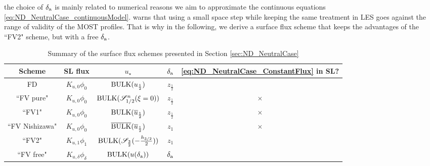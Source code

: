 the choice of $\delta_{\rm a}$ is mainly related to numerical
reasons we aim to approximate the continuous equations
\eqref{eq:ND_NeutralCase_continuousModel}.
\cite{basu_cautionary_2017} warns that using a small space step
while keeping the same treatment in LES goes against the
range of validity of the MOST profiles.
That is why in the following,
we derive a surface flux scheme that keeps
the advantages of the ``FV2" scheme, but with a free $\delta_{\rm a}$.
%
\begin{table}
	\centering
\begin{tabular}{c|c|c|c|c}
	Scheme & SL flux & $u_\star$ & $\delta_{\rm a}$ 
		& \eqref{eq:ND_NeutralCase_ConstantFlux} in SL? \\
		\hline
		FD & $K_{u,0} \phi_0$ & ${\rm BULK}(u_{\frac{1}{2}})$
			& $z_{\frac{1}{2}}$ & \checkmark \\
		``FV pure" & $K_{u,0} \phi_0$ &
			${\rm BULK}({\cal S}_{1/2}^{n}(\xi=0))$
			& $z_{\frac{1}{2}}$ & $\times$ \\
		``FV1" & $K_{u,0} \phi_0$ &
			${\rm BULK}(\overline{u}_{\frac{1}{2}})$
			& $z_{\frac{1}{2}}$ & $\times$ \\
		``FV Nishizawa" & $K_{u,0} \phi_0$ &
			$\overline{\rm BULK}
				(\overline{u}_{\frac{1}{2}})$
			& $z_1$ & $\times$ \\
		``FV2" & $K_{u,1} \phi_1$ &
			${\rm BULK} ({\cal S}_{\frac{3}{2}}(
				  -\frac{h_{3/2}}{2}))$
			& $z_1$ & \checkmark \\
		``FV free" & $K_{u,\delta} \phi_{\delta}$ &
			${\rm BULK}
				(u(\delta_{\rm a}))$
			& $\delta_{\rm a}$ & \checkmark \\
	\end{tabular}
	\caption{Summary of the surface flux schemes presented in
	Section \ref{sec:ND_NeutralCase}}
	\label{tab:ND_NeutralCase_summary_sfscheme}
\end{table}
